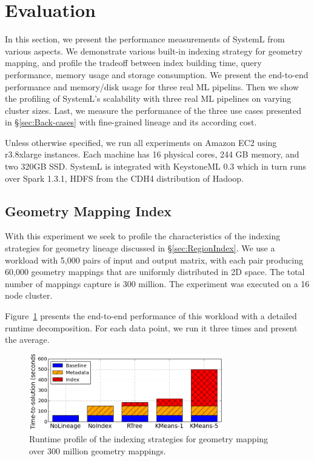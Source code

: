 \documentclass{sig-alternate}
\begin{document}
\section{Evaluation}
\label{sec:Perf}
In this section, we present the performance measurements of SystemL from various aspects.
We demonstrate various built-in indexing strategy for geometry mapping, and profile the tradeoff
between index building time, query performance, memory usage and storage consumption.
We present the end-to-end performance and memory/disk usage for three real ML pipelins.
Then we show the profiling of SystemL's scalability with three real ML pipelines on varying cluster sizes.
Last, we measure the performance of the three use cases presented in \S\ref{sec:Back-cases} with 
fine-grained lineage and its according cost.

Unless otherwise specified, we run all experiments on Amazon EC2 using r3.8xlarge instances.
Each machine has 16 physical cores, 244 GB memory, and two 320GB SSD. 
SystemL is integrated with KeystoneML 0.3 which in turn runs over Spark 1.3.1, HDFS from the
CDH4 distribution of Hadoop. 

\subsection{Geometry Mapping Index}
\label{sec:Perf-Index}
With this experiment we seek to profile the characteristics of the indexing strategies for geometry lineage discussed in \S\ref{sec:RegionIndex}.
We use a workload with 5,000 pairs of input and output matrix, with each pair producing 60,000 geometry mappings that are uniformly distributed
in 2D space. The total number of mappings capture is 300 million. The experiment was executed on a 16 node cluster.

Figure~\ref{fig:sift-time} presents the end-to-end performance of this workload with a detailed runtime decomposition. For each data point, 
we run it three times and present the average. 

\begin{figure}[h]
\begin{center}
    \includegraphics[width=85mm]{pictures/SIFTIndex-Time}
\caption {Runtime profile of the indexing strategies for geometry mapping over 300 million geometry mappings.
    \label{fig:sift-time}
}
\end{center}
\end{figure}
\end{document}

